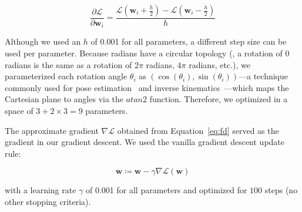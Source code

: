 \documentclass[10pt,twocolumn,letterpaper]{article}
\newcommand{\subsec}[1]{\noindent{\textbf{#1.}}}
\newcommand{\w}{\mathbf{w}}
\newcommand{\LL}{\mathcal{L}}
\begin{document}
\begin{equation} \label{eq:fd}
\frac{\partial \LL}{\partial \w_{i}} = \frac{\LL(\w_{i} + \frac{h}{2}) - \LL(\w_{i} - \frac{h}{2})}{h}
\end{equation}

\noindent
Although we used an $h$ of 0.001 for all parameters, a different step size can be used per parameter.
Because radians have a circular topology (\ie, a rotation of 0 radians is the same as a rotation of $2\pi$ radians, $4\pi$ radians, etc.), we parameterized each rotation angle $\theta_i$ as $(\cos(\theta_i), \sin(\theta_i))$---a technique commonly used for pose estimation~\cite{Osadchy2005} and inverse kinematics~\cite{Choi1992}---which maps the Cartesian plane to angles via the $atan2$ function.
Therefore, we optimized in a space of $3 + 2 \times 3 = 9$ parameters.

The approximate gradient $\nabla \LL$ obtained from Equation~\eqref{eq:fd} served as the gradient in our gradient descent.
We used the vanilla gradient descent update rule:

\begin{equation}
\w \coloneqq \w - \gamma{\nabla \LL}(\w)
\end{equation}

\noindent
with a learning rate $\gamma$ of 0.001 for all parameters and optimized for $100$ steps (no other stopping criteria).


%
\end{document}

